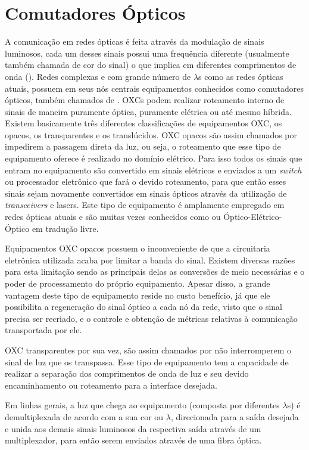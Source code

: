 \section{Comutadores Ópticos}
A comunicação em redes ópticas é feita através da modulação de sinais luminosos, cada um desses sinais possui uma frequência diferente (usualmente também chamada de cor do sinal) o que implica em diferentes comprimentos de onda (). Redes complexas e com grande número de $\lambda$s  como as redes ópticas atuais, possuem em seus nós centrais equipamentos conhecidos como comutadores ópticos, também chamados de . OXCs podem realizar roteamento interno de sinais de maneira puramente óptica, puramente elétrica ou até mesmo híbrida\cite{Book-Ramaswami2010}. Existem basicamente três diferentes classificações de equipamentos OXC, os opacos, os transparentes e os translúcidos.
OXC opacos são assim chamados por impedirem a passagem direta da luz, ou seja, o roteamento que esse tipo de equipamento oferece é realizado no domínio elétrico. Para isso todos os sinais que entram no equipamento são convertido em sinais elétricos e enviados a um \emph{switch} ou processador eletrônico que fará o devido roteamento, para que então esses sinais sejam novamente convertidos em sinais ópticos através da utilização de \emph{transceivers} e lasers. Este tipo de equipamento é amplamente empregado em redes ópticas atuais e são muitas vezes conhecidos como  ou Óptico-Elétrico-Óptico em tradução livre.

Equipamentos OXC opacos possuem o inconveniente de que a circuitaria eletrônica utilizada acaba por limitar a banda do sinal. Existem diversas razões para esta limitação sendo as principais delas as conversões de meio necessárias e o poder de processamento do próprio equipamento. Apesar disso, a grande vantagem deste tipo de equipamento reside no custo benefício, já que ele possibilita a regeneração do sinal óptico a cada nó da rede, visto que o sinal precisa ser recriado, e o controle e obtenção de métricas relativas à comunicação transportada por ele.  

OXC transparentes por sua vez, são assim chamados por não interromperem o sinal de luz que os transpassa. Esse tipo de equipamento tem a capacidade de realizar a separação dos comprimentos de onda de luz e seu devido encaminhamento ou roteamento para a interface desejada. 

Em linhas gerais, a luz que chega ao equipamento (composta por diferentes $\lambda$s) é demultiplexada de acordo com a sua cor ou $\lambda$, direcionada para a saída desejada e unida aos demais sinais luminosos da respectiva saída através de um multiplexador, para então serem enviados através de uma fibra óptica. 

